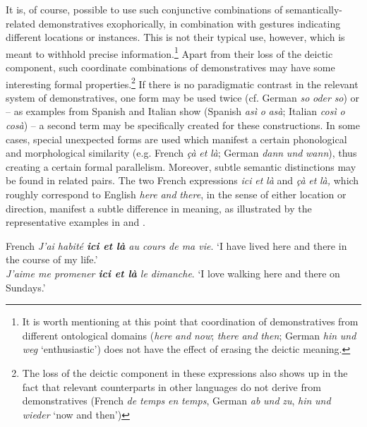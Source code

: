\documentclass[output=paper,colorlinks,citecolor=brown]{langscibook}
\begin{document}
It is, of course, possible to use such conjunctive combinations of semantically-related demonstratives exophorically, in combination with gestures indicating different locations or instances. This is not their typical use, however, which is meant to withhold precise information.\footnote{It is worth mentioning at this point that coordination of demonstratives from different ontological domains (\textit{here} \textit{and} \textit{now}; \textit{there} \textit{and} \textit{then}; German \textit{hin} \textit{und} \textit{weg} ‘enthusiastic’) does not have the effect of erasing the deictic meaning.} Apart from their loss of the deictic component, such coordinate combinations of demonstratives may have some interesting formal properties.\footnote{The loss of the deictic component in these expressions also shows up in the fact that relevant counterparts in other languages do not derive from demonstratives (French \textit{de} \textit{temps} \textit{en} \textit{temps}, German \textit{ab} \textit{und} \textit{zu}, \textit{hin} \textit{und} \textit{wieder} ‘now and then’)}  If there is no paradigmatic contrast in the relevant system of demonstratives, one form may be used twice (cf. German \textit{so} \textit{oder} \textit{so}) or – as examples from Spanish and Italian show (Spanish \textit{asì} \textit{o} \textit{asà}; Italian \textit{così} \textit{o} \textit{cosà}) – a second term may be specifically created for these constructions. In some cases, special unexpected forms are used which manifest a certain phonological and morphological similarity (e.g. French \textit{çà} \textit{et} \textit{là}; German \textit{dann} \textit{und} \textit{wann}), thus creating a certain formal parallelism. Moreover, subtle semantic distinctions may be found in related pairs. The two French expressions \textit{ici} \textit{et} \textit{là} and \textit{çà} \textit{et} \textit{là,} which roughly correspond to English \textit{here} \textit{and} \textit{there}, in the sense of either location or direction, manifest a subtle difference in meaning, as illustrated by the representative examples in  and .

\ea French\label{ex:koenig:6}
\ea \textit{J’ai habité \textbf{ici et là} au cours de ma vie}. \newline ‘I have lived here and there in the course of my life.’\\

\ex \textit{J’aime me promener \textbf{ici et là} le dimanche}. \newline ‘I love walking here and there on Sundays.’\\
\z
\z
\end{document}
